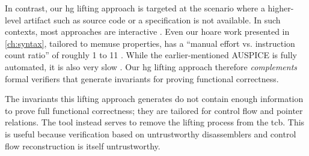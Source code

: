 In contrast, our \gls{hg} lifting approach is targeted at the scenario where a higher-level artifact such as source code or a specification is not available.
In such contexts, most approaches are interactive \autocite{goel2014syscalls,goelphd,verbeek2019refinement}.
Even our \gls{hoare} work presented in \cref{ch:syntax}, tailored to \gls{memuse} properties, has a ``manual effort vs. instruction count ratio'' of roughly 1 to 11 \autocite{verbeek2020automated}.
While the earlier-mentioned AUSPICE is fully automated, it is also very slow \textcite{tan2015auspice}.
Our \gls{hg} lifting approach therefore \emph{complements} formal verifiers that generate invariants for proving functional correctness.
\begin{remark}
  The invariants this lifting approach generates do not contain enough information to prove full functional correctness; they are tailored for control flow and pointer relations.
  The tool instead serves to remove the lifting process from the \gls{tcb}.
  This is useful because verification based on untrustworthy disassemblers and control flow reconstruction is itself untrustworthy.
\end{remark}

